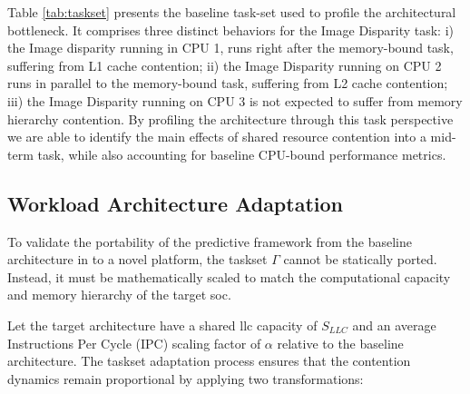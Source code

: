 \documentclass[conference]{IEEEtran}
\begin{document}
Table \ref{tab:taskset} presents the baseline task-set used to profile the architectural bottleneck. It comprises three distinct behaviors for the Image Disparity task: i) the Image disparity running in CPU 1, runs right after the memory-bound task, suffering from L1 cache contention; ii) the Image Disparity running on CPU 2 runs in parallel to the memory-bound task, suffering from L2 cache contention; iii) the Image Disparity running on CPU 3 is not expected to suffer from memory hierarchy contention. By profiling the architecture through this task perspective we are able to identify the main effects of shared resource contention into a mid-term task, while also accounting for baseline CPU-bound performance metrics.

\begin{table}[htbp]
\caption{Profiling Task-Set Configuration}
\label{tab:taskset}
\centering
{}
\end{table}

\subsection{Workload Architecture Adaptation}
To validate the portability of the predictive framework from the baseline architecture in \cite{hoffmann2022online} to a novel platform, the taskset $\Gamma$ cannot be statically ported. Instead, it must be mathematically scaled to match the computational capacity and memory hierarchy of the target \gls{soc}. 

Let the target architecture have a shared \gls{llc} capacity of $S_{LLC}$ and an average Instructions Per Cycle (IPC) scaling factor of $\alpha$ relative to the baseline architecture. The taskset adaptation process ensures that the contention dynamics remain proportional by applying two transformations:
\end{document}
